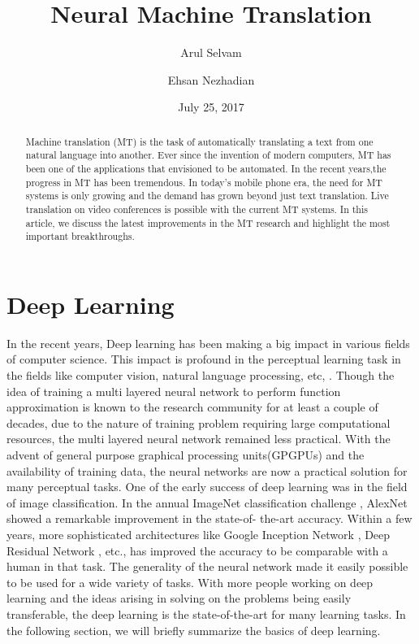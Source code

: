 \documentclass[a4paper]{article}
\begin{document}
\title{Neural Machine Translation}
\author{Arul Selvam}
\author{Ehsan Nezhadian}
\date{July 25, 2017}
\maketitle


\begin{abstract}
Machine translation (MT) is the task of automatically  translating  a  text from
one natural language into another. Ever since the invention of modern computers,
MT  has been  one of the  applications that envisioned  to be automated. In  the
recent years,the  progress in  MT has been  tremendous. In  today's mobile phone
era,  the need for MT systems is only  growing and  the demand  has grown beyond
just text  translation.  Live translation on video conferences  is possible with
the current MT systems. In this article, we discuss the  latest improvements  in
the MT research and highlight the most important breakthroughs.

\end{abstract}


\section{Deep Learning}
In the recent  years,  Deep  learning has  been making a big  impact  in various
fields of computer science. This impact is profound  in  the perceptual learning
task  in  the  fields like computer vision, natural  language  processing,  etc,
\cite{lecun2015deep}. Though the idea of training a multi layered neural network
to perform function  approximation  is  known to the research community  for  at
least  a couple  of  decades\cite{schmidhuber2015deep},  due  to the  nature  of
training  problem  requiring  large computational  resources, the multi  layered
neural  network remained  less  practical. With the  advent  of general  purpose
graphical  processing units(GPGPUs) and  the availability  of training data, the
neural  networks  are now a practical solution for many perceptual tasks. One of
the early success of deep learning was in  the field of image classification. In
the  annual ImageNet classification  challenge \cite{deng2009imagenet},  AlexNet
\cite{krizhevsky2012imagenet} showed a  remarkable improvement  in the state-of-
the-art  accuracy.  Within  a  few years, more sophisticated  architectures like
Google  Inception  Network \cite{szegedy2016rethinking},  Deep  Residual Network
\cite{he2016deep}, etc., has improved the accuracy to be comparable with a human
in that task. The generality of the neural network made it easily possible to be
used for a wide variety of tasks. With more people  working on deep learning and
the ideas arising in solving on the problems being easily transferable, the deep
learning  is the  state-of-the-art for  many learning  tasks. In  the  following
section, we will briefly summarize the basics of deep learning.
\end{document}
